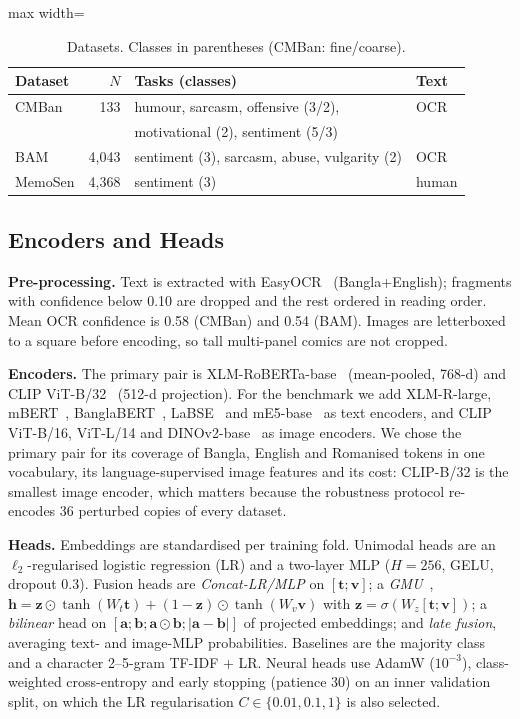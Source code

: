 \begin{table}[t]
\centering
\small
\caption{Datasets. Classes in parentheses (CMBan: fine/coarse).}
\label{tab:datasets}
\begin{adjustbox}{max width=\columnwidth}
\begin{tabular}{lrll}
\toprule
Dataset & $N$ & Tasks (classes) & Text \\
\midrule
CMBan & 133 & humour, sarcasm, offensive (3/2), & OCR \\
 & & motivational (2), sentiment (5/3) & \\
BAM & 4{,}043 & sentiment (3), sarcasm, abuse, vulgarity (2) & OCR \\
MemoSen & 4{,}368 & sentiment (3) & human \\
\bottomrule
\end{tabular}
\end{adjustbox}
\end{table}

\subsection{Encoders and Heads}
\label{sec:method:enc}

\textbf{Pre-processing.} Text is extracted with EasyOCR~\cite{easyocr} (Bangla+English); fragments with confidence
below 0.10 are dropped and the rest ordered in reading order. Mean OCR confidence is 0.58 (CMBan) and 0.54 (BAM).
Images are letterboxed to a square before encoding, so tall multi-panel comics are not cropped.

\textbf{Encoders.} The primary pair is XLM-RoBERTa-base~\cite{conneau2020xlmr} (mean-pooled, 768-d) and CLIP
ViT-B/32~\cite{radford2021clip} (512-d projection). For the benchmark we add XLM-R-large, mBERT~\cite{devlin2019bert},
BanglaBERT~\cite{bhattacharjee2022banglabert}, LaBSE~\cite{feng2022labse} and mE5-base~\cite{wang2024me5} as text
encoders, and CLIP ViT-B/16, ViT-L/14 and DINOv2-base~\cite{oquab2024dinov2} as image encoders. We chose the primary
pair for its coverage of Bangla, English and Romanised tokens in one vocabulary, its language-supervised image
features and its cost: CLIP-B/32 is the smallest image encoder, which matters because the robustness protocol
re-encodes 36 perturbed copies of every dataset.

\textbf{Heads.} Embeddings are standardised per training fold. Unimodal heads are an $\ell_2$-regularised logistic
regression (LR) and a two-layer MLP ($H=256$, GELU, dropout 0.3). Fusion heads are \emph{Concat-LR/MLP} on
$[\mathbf{t};\mathbf{v}]$; a \emph{GMU}~\cite{arevalo2017gmu},
$\mathbf{h}=\mathbf{z}\odot\tanh(W_t\mathbf{t})+(1-\mathbf{z})\odot\tanh(W_v\mathbf{v})$ with
$\mathbf{z}=\sigma(W_z[\mathbf{t};\mathbf{v}])$; a \emph{bilinear} head on
$[\mathbf{a};\mathbf{b};\mathbf{a}\odot\mathbf{b};|\mathbf{a}-\mathbf{b}|]$ of projected embeddings; and \emph{late
fusion}, averaging text- and image-MLP probabilities. Baselines are the majority class and a character 2--5-gram
TF-IDF + LR. Neural heads use AdamW ($10^{-3}$), class-weighted cross-entropy and early stopping (patience 30) on an
inner validation split, on which the LR regularisation $C\in\{0.01,0.1,1\}$ is also selected.

